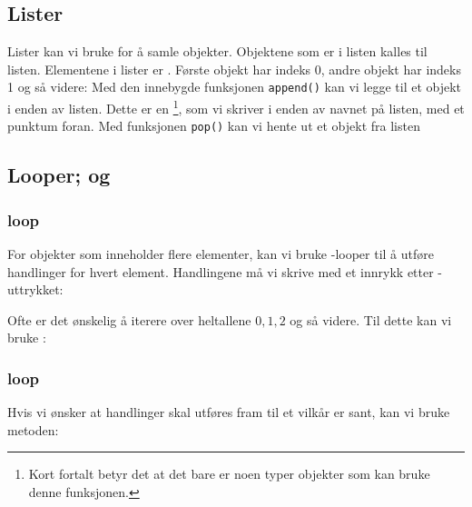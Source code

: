\subsection{Lister}
Lister kan vi bruke for å samle objekter. Objektene som er i listen kalles  til listen.
Elementene i lister er . Første objekt har indeks 0, andre objekt har indeks 1 og så videre:
Med den innebygde funksjonen \texttt{append()} kan vi legge til et objekt i enden av listen. Dette er en \footnote{Kort fortalt betyr det at det bare er noen typer objekter som kan bruke denne funksjonen.}, som vi skriver i enden av navnet på listen, med et punktum foran.
\newpage
Med funksjonen \texttt{pop()} kan vi hente ut et objekt fra listen
\newpage
\subsection{Looper;  og }
\subsubsection{ loop}
For objekter som inneholder flere elementer, kan vi bruke -looper til å utføre handlinger for hvert element. Handlingene må vi skrive med et innrykk etter -uttrykket:
\vsk

Ofte er det ønskelig å iterere over heltallene $ 0, 1, 2 $ og så videre. Til dette kan vi bruke :
\subsubsection{ loop}
Hvis vi ønsker at handlinger skal utføres fram til et vilkår er sant, kan vi bruke  metoden: \regv
{}
\newpage



